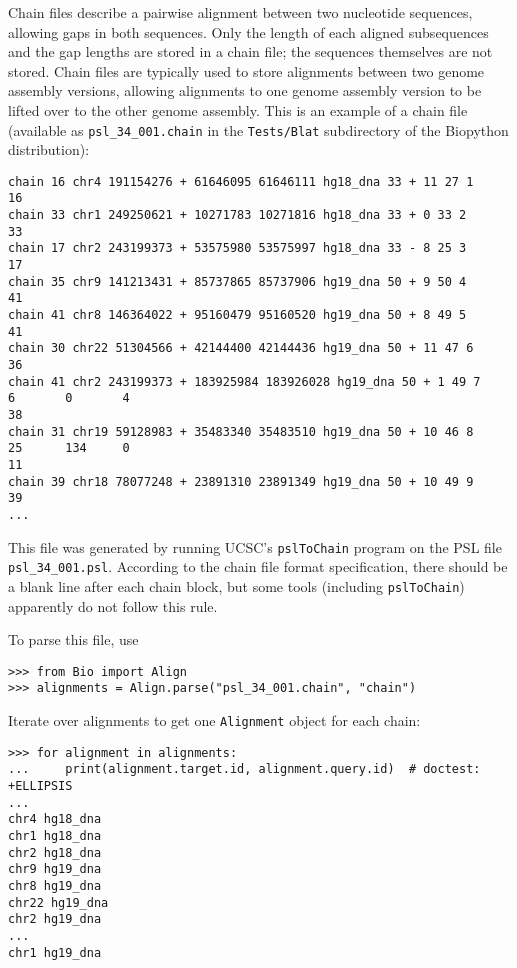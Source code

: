 Chain files describe a pairwise alignment between two nucleotide sequences, allowing gaps in both sequences. Only the length of each aligned subsequences and the gap lengths are stored in a chain file; the sequences themselves are not stored. Chain files are typically used to store alignments between two genome assembly versions, allowing alignments to one genome assembly version to be lifted over to the other genome assembly. This is an example of a chain file (available as \verb+psl_34_001.chain+ in the \verb+Tests/Blat+ subdirectory of the Biopython distribution):
\begin{verbatim}
chain 16 chr4 191154276 + 61646095 61646111 hg18_dna 33 + 11 27 1
16
chain 33 chr1 249250621 + 10271783 10271816 hg18_dna 33 + 0 33 2
33
chain 17 chr2 243199373 + 53575980 53575997 hg18_dna 33 - 8 25 3
17
chain 35 chr9 141213431 + 85737865 85737906 hg19_dna 50 + 9 50 4
41
chain 41 chr8 146364022 + 95160479 95160520 hg19_dna 50 + 8 49 5
41
chain 30 chr22 51304566 + 42144400 42144436 hg19_dna 50 + 11 47 6
36
chain 41 chr2 243199373 + 183925984 183926028 hg19_dna 50 + 1 49 7
6       0       4
38
chain 31 chr19 59128983 + 35483340 35483510 hg19_dna 50 + 10 46 8
25      134     0
11
chain 39 chr18 78077248 + 23891310 23891349 hg19_dna 50 + 10 49 9
39
...
\end{verbatim}
This file was generated by running UCSC's \verb+pslToChain+ program on the PSL file \verb+psl_34_001.psl+. According to the chain file format specification, there should be a blank line after each chain block, but some tools (including \verb+pslToChain+) apparently do not follow this rule.

To parse this file, use
\begin{verbatim}
>>> from Bio import Align
>>> alignments = Align.parse("psl_34_001.chain", "chain")
\end{verbatim}
Iterate over alignments to get one \verb|Alignment| object for each chain:
\begin{verbatim}
>>> for alignment in alignments:
...     print(alignment.target.id, alignment.query.id)  # doctest: +ELLIPSIS
...
chr4 hg18_dna
chr1 hg18_dna
chr2 hg18_dna
chr9 hg19_dna
chr8 hg19_dna
chr22 hg19_dna
chr2 hg19_dna
...
chr1 hg19_dna
\end{verbatim}

